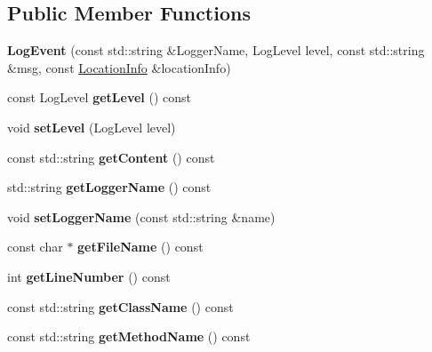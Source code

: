 \subsection*{Public Member Functions}
\begin{DoxyCompactItemize}
\item 
\mbox{\label{classdaq_1_1LogEvent_a80a814b66875b74bc1407ddc2f69a552}} 
{\bfseries Log\+Event} (const std\+::string \&Logger\+Name, Log\+Level level, const std\+::string \&msg, const \hyperlink{classdaq_1_1LocationInfo}{Location\+Info} \&location\+Info)
\item 
\mbox{\label{classdaq_1_1LogEvent_a2f6acb3cc63087e192b437f9fd21632c}} 
const Log\+Level {\bfseries get\+Level} () const
\item 
\mbox{\label{classdaq_1_1LogEvent_aa16f9763bc51d9925d8875bba9e20daf}} 
void {\bfseries set\+Level} (Log\+Level level)
\item 
\mbox{\label{classdaq_1_1LogEvent_aec78800a719d5fdff81506626bdbb658}} 
const std\+::string {\bfseries get\+Content} () const
\item 
\mbox{\label{classdaq_1_1LogEvent_a73f8415f0a876d7ee6cc0a7b66972d27}} 
std\+::string {\bfseries get\+Logger\+Name} () const
\item 
\mbox{\label{classdaq_1_1LogEvent_a1fc1935a0172887fdabf876a361bbb3d}} 
void {\bfseries set\+Logger\+Name} (const std\+::string \&name)
\item 
\mbox{\label{classdaq_1_1LogEvent_ae3b6c5802e0c84df14cc275f63da1eba}} 
const char $\ast$ {\bfseries get\+File\+Name} () const
\item 
\mbox{\label{classdaq_1_1LogEvent_a12cada322544d0e98aee4a45256ddb53}} 
int {\bfseries get\+Line\+Number} () const
\item 
\mbox{\label{classdaq_1_1LogEvent_a837482b5acfc9891fe9a0a3f1e749973}} 
const std\+::string {\bfseries get\+Class\+Name} () const
\item 
\mbox{\label{classdaq_1_1LogEvent_afe838e3d7e40a4901c928eff2a887862}} 
const std\+::string {\bfseries get\+Method\+Name} () const
\end{DoxyCompactItemize}
